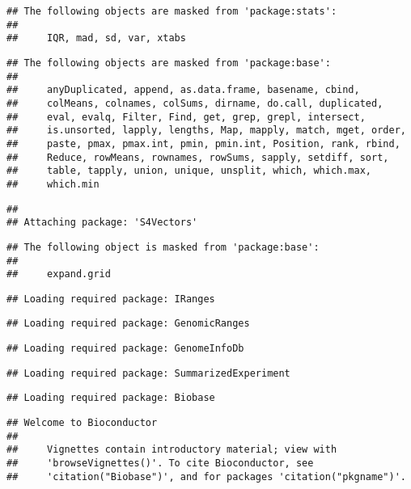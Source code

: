 \documentclass[]{article}
\begin{document}
\begin{verbatim}
## The following objects are masked from 'package:stats':
## 
##     IQR, mad, sd, var, xtabs
\end{verbatim}

\begin{verbatim}
## The following objects are masked from 'package:base':
## 
##     anyDuplicated, append, as.data.frame, basename, cbind,
##     colMeans, colnames, colSums, dirname, do.call, duplicated,
##     eval, evalq, Filter, Find, get, grep, grepl, intersect,
##     is.unsorted, lapply, lengths, Map, mapply, match, mget, order,
##     paste, pmax, pmax.int, pmin, pmin.int, Position, rank, rbind,
##     Reduce, rowMeans, rownames, rowSums, sapply, setdiff, sort,
##     table, tapply, union, unique, unsplit, which, which.max,
##     which.min
\end{verbatim}

\begin{verbatim}
## 
## Attaching package: 'S4Vectors'
\end{verbatim}

\begin{verbatim}
## The following object is masked from 'package:base':
## 
##     expand.grid
\end{verbatim}

\begin{verbatim}
## Loading required package: IRanges
\end{verbatim}

\begin{verbatim}
## Loading required package: GenomicRanges
\end{verbatim}

\begin{verbatim}
## Loading required package: GenomeInfoDb
\end{verbatim}

\begin{verbatim}
## Loading required package: SummarizedExperiment
\end{verbatim}

\begin{verbatim}
## Loading required package: Biobase
\end{verbatim}

\begin{verbatim}
## Welcome to Bioconductor
## 
##     Vignettes contain introductory material; view with
##     'browseVignettes()'. To cite Bioconductor, see
##     'citation("Biobase")', and for packages 'citation("pkgname")'.
\end{verbatim}
\end{document}
